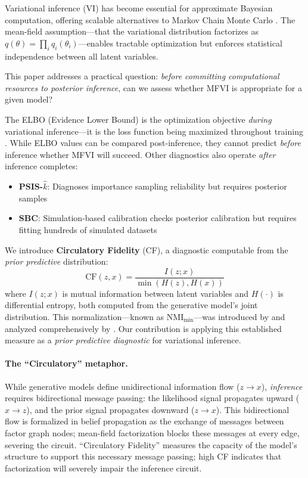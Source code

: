 \documentclass[10pt]{article} %
\theoremstyle{plain}
\theoremstyle{definition}
\newcommand{\CF}{\mathrm{CF}}
\newcommand{\MI}{I}
\newcommand{\Ent}{H}
\begin{document}
Variational inference (VI) has become essential for approximate Bayesian computation, offering scalable alternatives to Markov Chain Monte Carlo \citep{blei2017variational}. The mean-field assumption---that the variational distribution factorizes as $q(\theta) = \prod_i q_i(\theta_i)$---enables tractable optimization but enforces statistical independence between all latent variables.

This paper addresses a practical question: \emph{before committing computational resources to posterior inference}, can we assess whether MFVI is appropriate for a given model?

The ELBO (Evidence Lower Bound) is the optimization objective \emph{during} variational inference---it is the loss function being maximized throughout training \citep{blei2017variational}. While ELBO values can be compared post-inference, they cannot predict \emph{before} inference whether MFVI will succeed. Other diagnostics also operate \emph{after} inference completes:
\begin{itemize}
    \item \textbf{PSIS-$\hat{k}$}: Diagnoses importance sampling reliability but requires posterior samples \citep{vehtari2017practical}
    \item \textbf{SBC}: Simulation-based calibration checks posterior calibration but requires fitting hundreds of simulated datasets \citep{talts2018validating}
\end{itemize}

We introduce \textbf{Circulatory Fidelity} (CF), a diagnostic computable from the \emph{prior predictive} distribution:
\begin{equation}
\CF(z, x) = \frac{\MI(z; x)}{\min(\Ent(z), \Ent(x))}
\label{eq:cf}
\end{equation}
where $\MI(z;x)$ is mutual information between latent variables and $\Ent(\cdot)$ is differential entropy, both computed from the generative model's joint distribution. This normalization---known as $\text{NMI}_{\min}$---was introduced by \citet{kvalseth1987entropy} and analyzed comprehensively by \citet{vinh2010information}. Our contribution is applying this established measure as a \emph{prior predictive diagnostic} for variational inference.

\paragraph{The ``Circulatory'' metaphor.} While generative models define unidirectional information flow ($z \to x$), \emph{inference} requires bidirectional message passing: the likelihood signal propagates upward ($x \to z$), and the prior signal propagates downward ($z \to x$). This bidirectional flow is formalized in belief propagation as the exchange of messages between factor graph nodes; mean-field factorization blocks these messages at every edge, severing the circuit. ``Circulatory Fidelity'' measures the capacity of the model's structure to support this necessary message passing; high CF indicates that factorization will severely impair the inference circuit.
\end{document}
